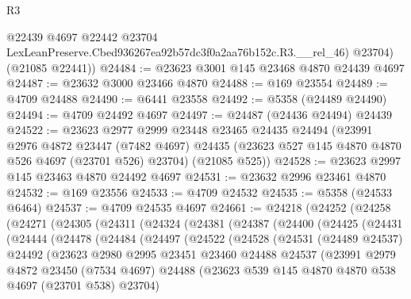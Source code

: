\begin{lexlean}{R3}
\begin{coremodule}
          @22439
          @4697
          @22442
          @23704
          LexLeanPreserve.Cbed936267ea92b57dc3f0a2aa76b152c.R3.__rel_46)
        @23704)
      (@21085 @22441))
@24484 := @23623 @3001 @145 @23468 @4870 @24439 @4697
@24487 := @23632 @3000 @23466 @4870
@24488 := @169 @23554
@24489 := @4709 @24488
@24490 := @6441 @23558
@24492 := @5358 (@24489 @24490)
@24494 := @4709 @24492 @4697
@24497 := @24487 (@24436 @24494) @24439
@24522 := @23623
    @2977
    @2999
    @23448
    @23465
    @24435
    @24494
    (@23991
      @2976
      @4872
      @23447
      (@7482 @4697)
      @24435
      (@23623 @527 @145 @4870 @4870 @526 @4697 (@23701 @526) @23704)
      (@21085 @525))
@24528 := @23623 @2997 @145 @23463 @4870 @24492 @4697
@24531 := @23632 @2996 @23461 @4870
@24532 := @169 @23556
@24533 := @4709 @24532
@24535 := @5358 (@24533 @6464)
@24537 := @4709 @24535 @4697
@24661 := @24218
    (@24252
      (@24258
        (@24271
          (@24305
            (@24311
              (@24324
                (@24381
                  (@24387
                    (@24400
                      (@24425
                        (@24431
                          (@24444
                            (@24478
                              (@24484
                                (@24497
                                  (@24522
                                    (@24528
                                      (@24531
                                        (@24489 @24537)
                                        @24492
                                        (@23623
                                          @2980
                                          @2995
                                          @23451
                                          @23460
                                          @24488
                                          @24537
                                          (@23991
                                            @2979
                                            @4872
                                            @23450
                                            (@7534 @4697)
                                            @24488
                                            (@23623
                                              @539
                                              @145
                                              @4870
                                              @4870
                                              @538
                                              @4697
                                              (@23701 @538)
                                              @23704)

\end{coremodule}
\end{lexlean}
